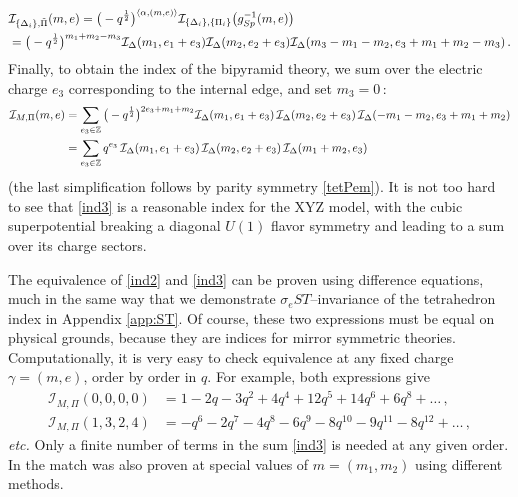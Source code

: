 \documentclass[11pt,letterpaper]{article}
\numberwithin{equation}{section}
\newcommand{\Z}{{\mathbb Z}}
\newcommand{\CI}{\mathcal{I}}
\begin{document}
%
\begin{align} \CI_{\{\Delta_i\},\tilde\Pi}(m,e) &= \big(-q^{\frac12}\big)^{\langle \alpha,(m,e)\rangle}\CI_{\{\Delta_i\},\{\Pi_i\}}\big(g_{Sp}^{-1}(m,e)\big) \notag \\
 &\hspace{-.8in}= \big(-q^{\frac12}\big)^{m_1+m_2-m_3}\CI_\Delta(m_1,e_1+e_3)\CI_\Delta(m_2,e_2+e_3)\CI_\Delta(m_3-m_1-m_2,e_3+m_1+m_2-m_3)\,. \notag
\end{align}
%
Finally, to obtain the index of the bipyramid theory, we sum over the electric charge $e_3$ corresponding to the internal edge, and set $m_3=0$\,:
%
\begin{align} \CI_{M,\Pi}(m,e) &= \sum_{e_3\in \Z} \big(-q^{\frac12}\big)^{2e_3+m_1+m_2}\CI_\Delta(m_1,e_1+e_3)\,\CI_\Delta(m_2,e_2+e_3)\,\CI_\Delta(-m_1-m_2,e_3+m_1+m_2) \notag \\
&= \sum_{e_3\in \Z} q^{e_3}\,\CI_\Delta(m_1,e_1+e_3)\,\CI_\Delta(m_2,e_2+e_3)\,\CI_\Delta(m_1+m_2,e_3)
\label{ind3}
\end{align}
%
(the last simplification follows by parity symmetry \eqref{tetPem}). It is not too hard to see that \eqref{ind3} is a reasonable index for the XYZ model, with the cubic superpotential breaking a diagonal $U(1)$ flavor symmetry and leading to a sum over its charge sectors.


The equivalence of \eqref{ind2} and \eqref{ind3} can be proven using difference equations, much in the same way that we demonstrate $\sigma_eST$--invariance of the tetrahedron index in Appendix \ref{app:ST}. Of course, these two expressions must be equal on physical grounds, because they are indices for mirror symmetric theories. Computationally, it is very easy to check equivalence at any fixed charge $\gamma=(m,e)$, order by order in $q$. For example, both expressions give
%
\begin{align*} \CI_{M,\Pi}(0,0,0,0) &= 1-2q-3q^2+4q^4+12q^5+14q^6+6q^8+\ldots\,, \\
\CI_{M,\Pi}(1,3,2,4) &= -q^6-2q^7-4q^8-6q^9-8q^{10}-9q^{11}-8q^{12}+\ldots\,,
\end{align*}
%
{\it etc.} Only a finite number of terms in the sum \eqref{ind3} is needed at any given order. In \cite{KSV-index, KW-index} the match was also proven at special values of $m=(m_1,m_2)$ using different methods.
\end{document}
